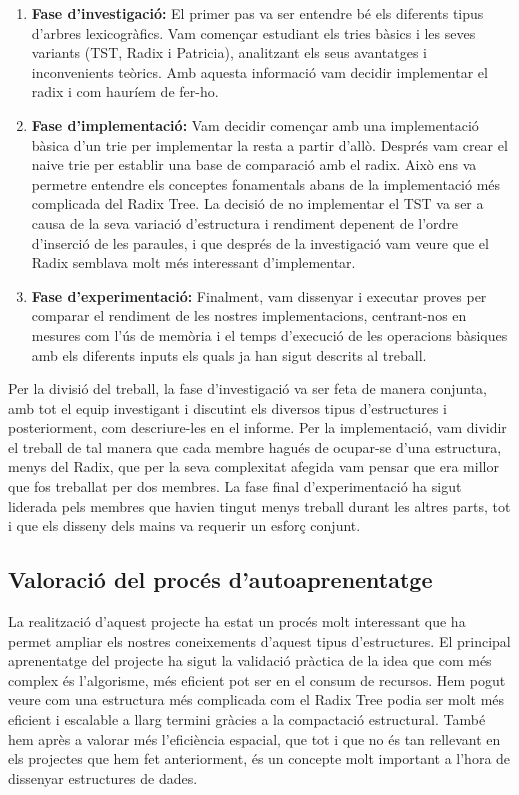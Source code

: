 \begin{enumerate}
    \item \textbf{Fase d'investigació:} El primer pas va ser entendre bé els diferents tipus d'arbres lexicogràfics. Vam començar estudiant els tries bàsics i les seves variants (TST, Radix i Patricia), analitzant els seus avantatges i inconvenients teòrics. Amb aquesta informació vam decidir implementar el radix i com hauríem de fer-ho.

    \item \textbf{Fase d'implementació:} Vam decidir començar amb una implementació bàsica d'un trie per implementar la resta a partir d'allò. Després vam crear el naive trie per establir una base de comparació amb el radix. Això ens va permetre entendre els conceptes fonamentals abans de la implementació més complicada del Radix Tree. La decisió de no implementar el TST va ser a causa de la seva variació d'estructura i rendiment depenent de l'ordre d'inserció de les paraules, i que després de la investigació vam veure que el Radix semblava molt més interessant d'implementar.

    \item \textbf{Fase d'experimentació:} Finalment, vam dissenyar i executar proves per comparar el rendiment de les nostres implementacions, centrant-nos en mesures com l'ús de memòria i el temps d'execució de les operacions bàsiques amb els diferents inputs els quals ja han sigut descrits al treball.
\end{enumerate}
Per la divisió del treball, la fase d'investigació va ser feta de manera conjunta, amb tot el equip investigant i discutint els diversos tipus d'estructures i posteriorment, com descriure-les en el informe. Per la implementació, vam dividir el treball de tal manera que cada membre hagués de ocupar-se d'una estructura, menys del Radix, que per la seva complexitat afegida vam pensar que era millor que fos treballat per dos membres.
La fase final d'experimentació ha sigut liderada pels membres que havien tingut menys treball durant les altres parts, tot i que els disseny dels mains va requerir un esforç conjunt.

\subsection{Valoració del procés d'autoaprenentatge}

La realització d'aquest projecte ha estat un procés molt interessant que ha permet ampliar els nostres coneixements d'aquest tipus d'estructures. El principal aprenentatge del projecte ha sigut la validació pràctica de la idea que com més complex és l'algorisme, més eficient pot ser en el consum de recursos. Hem pogut veure com una estructura més complicada com el Radix Tree podia ser molt més eficient i escalable a llarg termini gràcies a la compactació estructural. També hem après a valorar més l'eficiència espacial, que tot i que no és tan rellevant en els projectes que hem fet anteriorment, és un concepte molt important a l'hora de dissenyar estructures de dades.

